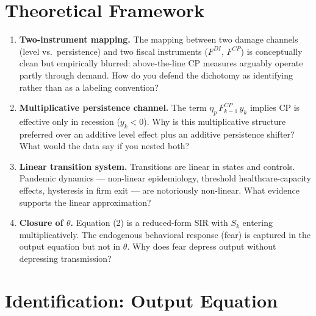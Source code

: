 \documentclass[11pt,a4paper]{article}
\begin{document}
\section{Theoretical Framework}

\begin{enumerate}
\item \textbf{Two-instrument mapping.} The mapping between two damage channels (level vs.\ persistence) and two fiscal instruments ($F^{DI}$, $F^{CP}$) is conceptually clean but empirically blurred: above-the-line CP measures arguably operate partly through demand. How do you defend the dichotomy as identifying rather than as a labeling convention?

\item \textbf{Multiplicative persistence channel.} The term $\eta_p\, F^{CP}_{k-1}\, y_k$ implies CP is effective only in recession ($y_k<0$). Why is this multiplicative structure preferred over an additive level effect plus an additive persistence shifter? What would the data say if you nested both?

\item \textbf{Linear transition system.} Transitions are linear in states and controls. Pandemic dynamics — non-linear epidemiology, threshold healthcare-capacity effects, hysteresis in firm exit — are notoriously non-linear. What evidence supports the linear approximation?

\item \textbf{Closure of $\theta$.} Equation (2) is a reduced-form SIR with $S_k$ entering multiplicatively. The endogenous behavioral response (fear) is captured in the output equation but not in $\theta$. Why does fear depress output without depressing transmission?
\end{enumerate}

\section{Identification: Output Equation}
\end{document}
